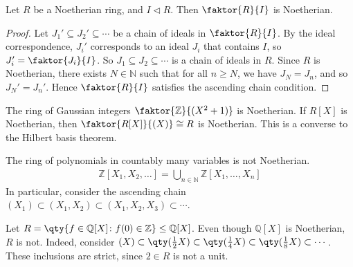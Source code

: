 \begin{lemma}
	Let $R$ be a Noetherian ring, and $I \triangleleft R$.
	Then $\faktor{R}{I}$ is Noetherian.
\end{lemma}
\begin{proof}
	Let $J_1' \subseteq J_2' \subseteq \cdots$ be a chain of ideals in $\faktor{R}{I}$.
	By the ideal correspondence, $J_i'$ corresponds to an ideal $J_i$ that contains $I$, so $J_i' = \faktor{J_i}{I}$.
	So $J_1 \subseteq J_2 \subseteq \cdots$ is a chain of ideals in $R$.
	Since $R$ is Noetherian, there exists $N \in \mathbb N$ such that for all $n \geq N$, we have $J_N = J_n$, and so $J_N' = J_n'$.
	Hence $\faktor{R}{I}$ satisfies the ascending chain condition.
\end{proof}
\begin{example}
	The ring of Gaussian integers $\faktor{\mathbb Z}{(X^2 + 1)}$ is Noetherian.
	If $R[X]$ is Noetherian, then $\faktor{R[X]}{(X)} \cong R$ is Noetherian.
	This is a converse to the Hilbert basis theorem.

	The ring of polynomials in countably many variables is not Noetherian.
	\begin{align*}
		\mathbb Z[X_1, X_2, \dots] = \bigcup_{n \in \mathbb N} \mathbb Z[X_1, \dots, X_n]
	\end{align*}
	In particular, consider the ascending chain $(X_1) \subset (X_1, X_2) \subset (X_1, X_2, X_3) \subset \cdots$.

	Let $R = \qty{f \in \mathbb Q[X] \colon f(0) \in \mathbb Z} \leq \mathbb Q[X]$.
	Even though $\mathbb Q[X]$ is Noetherian, $R$ is not.
	Indeed, consider $(X) \subset \qty(\frac{1}{2} X) \subset \qty(\frac{1}{4}X) \subset \qty(\frac{1}{8}X) \subset \cdots$.
	These inclusions are strict, since $2 \in R$ is not a unit.
\end{example}
